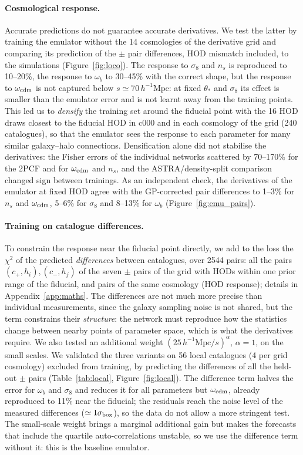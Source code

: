 \documentclass[11pt,twocolumn]{article}
\newcommand{\Mpch}{\,h^{-1}\mathrm{Mpc}}
\begin{document}
\paragraph{Cosmological response.} Accurate predictions do not guarantee accurate derivatives. We test the latter by training the emulator without the 14 cosmologies of the derivative grid and comparing its prediction of the $\pm$ pair differences, HOD mismatch included, to the simulations (Figure~\ref{fig:loco}). The response to $\sigma_8$ and $n_s$ is reproduced to 10--20\%, the response to $\omega_b$ to 30--45\% with the correct shape, but the response to $\omega_{\rm cdm}$ is not captured below $s\simeq70\Mpch$: at fixed $\theta_*$ and $\sigma_8$ its effect is smaller than the emulator error and is not learnt away from the training points. This led us to \emph{densify} the training set around the fiducial point with the 16 HOD draws closest to the fiducial HOD in c000 and in each cosmology of the grid (240 catalogues), so that the emulator sees the response to each parameter for many similar galaxy--halo connections. Densification alone did not stabilise the derivatives: the Fisher errors of the individual networks scattered by 70--170\% for the 2PCF and for $\omega_{\rm cdm}$ and $n_s$, and the ASTRA/density-split comparison changed sign between trainings. As an independent check, the derivatives of the emulator at fixed HOD agree with the GP-corrected pair differences to 1--3\% for $n_s$ and $\omega_{\rm cdm}$, 5--6\% for $\sigma_8$ and 8--13\% for $\omega_b$ (Figure~\ref{fig:emu_pairs}).

\paragraph{Training on catalogue differences.} To constrain the response near the fiducial point directly, we add to the loss the $\chi^2$ of the predicted \emph{differences} between catalogues, over 2544 pairs: all the pairs $(c_+,h_i),(c_-,h_j)$ of the seven $\pm$ pairs of the grid with HODs within one prior range of the fiducial, and pairs of the same cosmology (HOD response); details in Appendix~\ref{app:maths}. The differences are not much more precise than individual measurements, since the galaxy sampling noise is not shared, but the term constrains their \emph{structure}: the network must reproduce how the statistics change between nearby points of parameter space, which is what the derivatives require. We also tested an additional weight $(25\Mpch/s)^\alpha$, $\alpha=1$, on the small scales. We validated the three variants on 56 local catalogues (4 per grid cosmology) excluded from training, by predicting the differences of all the held-out $\pm$ pairs (Table~\ref{tab:local}, Figure~\ref{fig:local}). The difference term halves the error for $\omega_b$ and $\sigma_8$ and reduces it for all parameters but $\omega_{\rm cdm}$, already reproduced to 11\% near the fiducial; the residuals reach the noise level of the measured differences ($\simeq1\sigma_{\rm box}$), so the data do not allow a more stringent test. The small-scale weight brings a marginal additional gain but makes the forecasts that include the quartile auto-correlations unstable, so we use the difference term without it: this is the baseline emulator.
\end{document}
